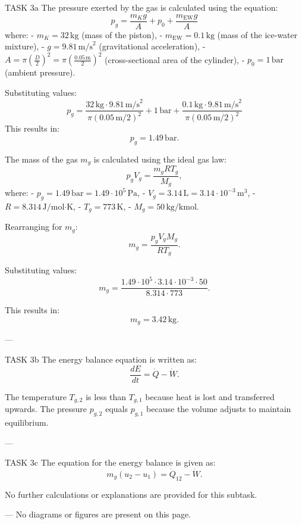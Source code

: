 TASK 3a  
The pressure exerted by the gas is calculated using the equation:  
\[
p_g = \frac{m_K g}{A} + p_0 + \frac{m_{\text{EW}} g}{A}
\]  
where:  
- \( m_K = 32 \, \text{kg} \) (mass of the piston),  
- \( m_{\text{EW}} = 0.1 \, \text{kg} \) (mass of the ice-water mixture),  
- \( g = 9.81 \, \text{m/s}^2 \) (gravitational acceleration),  
- \( A = \pi \left(\frac{D}{2}\right)^2 = \pi \left(\frac{0.05 \, \text{m}}{2}\right)^2 \) (cross-sectional area of the cylinder),  
- \( p_0 = 1 \, \text{bar} \) (ambient pressure).  

Substituting values:  
\[
p_g = \frac{32 \, \text{kg} \cdot 9.81 \, \text{m/s}^2}{\pi \left(0.05 \, \text{m}/2\right)^2} + 1 \, \text{bar} + \frac{0.1 \, \text{kg} \cdot 9.81 \, \text{m/s}^2}{\pi \left(0.05 \, \text{m}/2\right)^2}
\]  
This results in:  
\[
p_g = 1.49 \, \text{bar}.
\]  

The mass of the gas \( m_g \) is calculated using the ideal gas law:  
\[
p_g V_g = \frac{m_g R T_g}{M_g},
\]  
where:  
- \( p_g = 1.49 \, \text{bar} = 1.49 \cdot 10^5 \, \text{Pa} \),  
- \( V_g = 3.14 \, \text{L} = 3.14 \cdot 10^{-3} \, \text{m}^3 \),  
- \( R = 8.314 \, \text{J/mol·K} \),  
- \( T_g = 773 \, \text{K} \),  
- \( M_g = 50 \, \text{kg/kmol} \).  

Rearranging for \( m_g \):  
\[
m_g = \frac{p_g V_g M_g}{R T_g}.
\]  

Substituting values:  
\[
m_g = \frac{1.49 \cdot 10^5 \cdot 3.14 \cdot 10^{-3} \cdot 50}{8.314 \cdot 773}.
\]  

This results in:  
\[
m_g = 3.42 \, \text{kg}.
\]  

---

TASK 3b  
The energy balance equation is written as:  
\[
\frac{dE}{dt} = \dot{Q} - \dot{W}.
\]  

The temperature \( T_{g,2} \) is less than \( T_{g,1} \) because heat is lost and transferred upwards. The pressure \( p_{g,2} \) equals \( p_{g,1} \) because the volume adjusts to maintain equilibrium.  

---

TASK 3c  
The equation for the energy balance is given as:  
\[
m_g (u_2 - u_1) = \dot{Q}_{12} - \dot{W}.
\]  

No further calculations or explanations are provided for this subtask.  

---  
No diagrams or figures are present on this page.